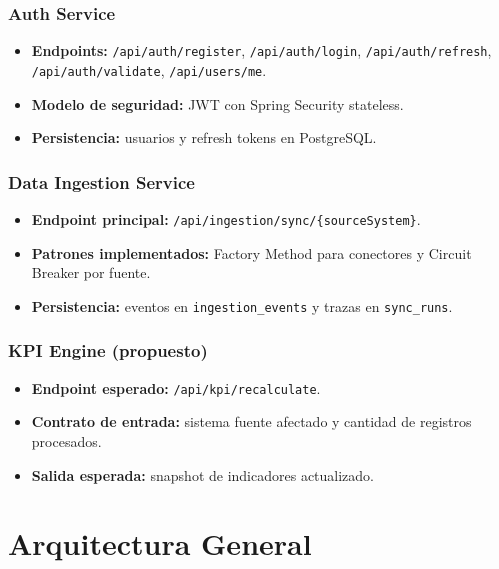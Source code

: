 \documentclass[12pt,a4paper]{article}
\begin{document}
\subsubsection*{Auth Service}
\begin{itemize}[leftmargin=1.2cm]
  \item \textbf{Endpoints:} \texttt{/api/auth/register}, \texttt{/api/auth/login}, \texttt{/api/auth/refresh}, \texttt{/api/auth/validate}, \texttt{/api/users/me}.
  \item \textbf{Modelo de seguridad:} JWT con Spring Security stateless.
  \item \textbf{Persistencia:} usuarios y refresh tokens en PostgreSQL.
\end{itemize}

\subsubsection*{Data Ingestion Service}
\begin{itemize}[leftmargin=1.2cm]
  \item \textbf{Endpoint principal:} \texttt{/api/ingestion/sync/\{sourceSystem\}}.
  \item \textbf{Patrones implementados:} Factory Method para conectores y Circuit Breaker por fuente.
  \item \textbf{Persistencia:} eventos en \texttt{ingestion\_events} y trazas en \texttt{sync\_runs}.
\end{itemize}

\subsubsection*{KPI Engine (propuesto)}
\begin{itemize}[leftmargin=1.2cm]
  \item \textbf{Endpoint esperado:} \texttt{/api/kpi/recalculate}.
  \item \textbf{Contrato de entrada:} sistema fuente afectado y cantidad de registros procesados.
  \item \textbf{Salida esperada:} snapshot de indicadores actualizado.
\end{itemize}

\section{Arquitectura General}
\end{document}
